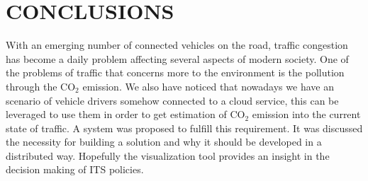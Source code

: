 \documentclass[letter, 10pt, conference]{ieeeconf}
\begin{document}
\section{CONCLUSIONS}

With an emerging number of connected vehicles on the road, traffic congestion has become a daily problem affecting several aspects of modern society.
One of the problems of traffic that concerns more to the environment is the pollution through the CO$_2$ emission.
We also have noticed that nowadays we have an scenario of vehicle drivers somehow connected to a cloud service, this can be leveraged to use them in order to get estimation of CO$_2$ emission into the current state of traffic.
A system was proposed to fulfill this requirement.
It was discussed the necessity for building a solution and why it should be developed in a distributed way.
Hopefully the visualization tool provides an insight in the decision making of ITS policies.

\addtolength{\textheight}{-12cm}




\end{document}
